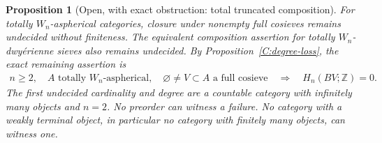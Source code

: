 \documentclass[11pt,a4paper]{article}
\newtheorem{proposition}[theorem]{Proposition}
\theoremstyle{definition}
\theoremstyle{remark}
\begin{document}
\begin{proposition}[Open, with exact obstruction: total truncated composition]\label{C:remaining-total}
For totally $W_n$-aspherical categories, closure under nonempty full cosieves remains undecided without finiteness. The equivalent composition assertion for \emph{totally} $W_n$-dwy\'erienne sieves also remains undecided. By Proposition~\ref{C:degree-loss}, the exact remaining assertion is
\[
 \begin{gathered}
 n\geq2,\quad A\text{ totally }W_n\text{-aspherical},\quad
 \varnothing\ne V\subset A\text{ a full cosieve}\quad\Longrightarrow\quad
 H_n(BV;\mathbb Z)=0.
 \end{gathered}
\]
The first undecided cardinality and degree are a countable category with infinitely many objects and $n=2$. No preorder can witness a failure. No category with a weakly terminal object, in particular no category with finitely many objects, can witness one.
\end{proposition}
\end{document}
